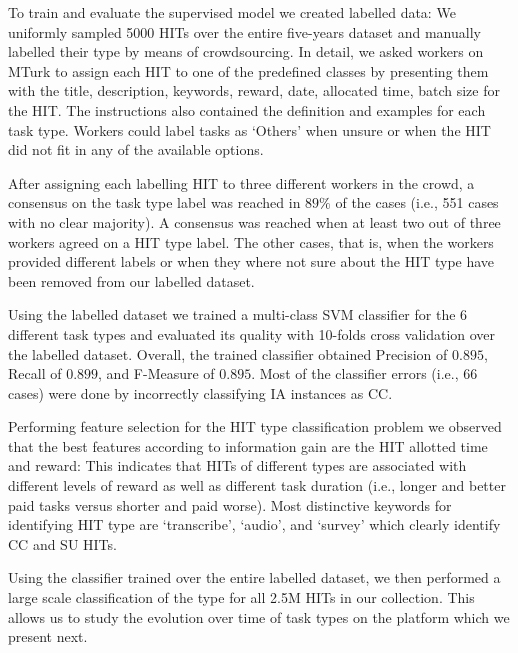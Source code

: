 To train and evaluate the supervised model we created labelled data: We uniformly sampled 5000 HITs over the entire five-years dataset and manually labelled their type by means of crowdsourcing. In detail, we asked workers on MTurk to assign each HIT to one of the predefined classes by presenting them with the title, description, keywords, reward, date, allocated time, batch size for the HIT. The instructions also contained the definition and examples for each task type. Workers could label tasks as `Others' when unsure or when the HIT did not fit in any of the available options.

After assigning each labelling HIT to three different workers in the crowd, a consensus on the task type label was reached in $89\%$ of the cases (i.e., 551 cases with no clear majority). A consensus was reached when at least two out of three workers agreed on a HIT type label. The other cases, that is, when the workers provided different labels or when they where not sure about the HIT type have been removed from our labelled dataset.

Using the labelled dataset we trained a multi-class SVM classifier for the 6 different task types and evaluated its quality with 10-folds cross validation over the labelled dataset. Overall, the trained classifier obtained Precision of $0.895$, Recall of $0.899$, and F-Measure of $0.895$. Most of the classifier errors (i.e., 66 cases) were done by incorrectly classifying IA instances as CC.

Performing feature selection for the HIT type classification problem we observed that the best features according to information gain are the HIT allotted time and reward: This indicates that HITs of different types are associated with different levels of reward as well as different task duration (i.e., longer and better paid tasks versus shorter and paid worse). 
Most distinctive keywords for identifying HIT type are `transcribe', `audio', and `survey' which clearly identify CC and SU HITs.
 
Using the classifier trained over the entire labelled dataset, we then performed a large scale classification of the type for all 2.5M HITs in our collection. This allows us to study the evolution over time of task types on the \amt{} platform which we present next.

